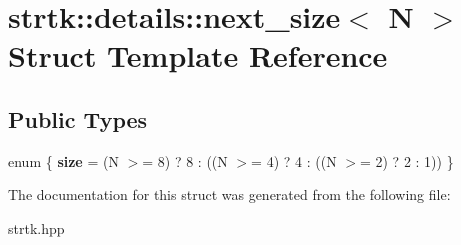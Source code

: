 \hypertarget{structstrtk_1_1details_1_1next__size}{\section{strtk\-:\-:details\-:\-:next\-\_\-size$<$ N $>$ Struct Template Reference}
\label{structstrtk_1_1details_1_1next__size}
}
\subsection*{Public Types}
\begin{DoxyCompactItemize}
\item 
enum \{ {\bfseries size} = (N $>$= 8) ? 8 \-: ((N $>$= 4) ? 4 \-: ((N $>$= 2) ? 2 \-: 1))
 \}
\end{DoxyCompactItemize}


The documentation for this struct was generated from the following file\-:\begin{DoxyCompactItemize}
\item 
strtk.\-hpp\end{DoxyCompactItemize}
